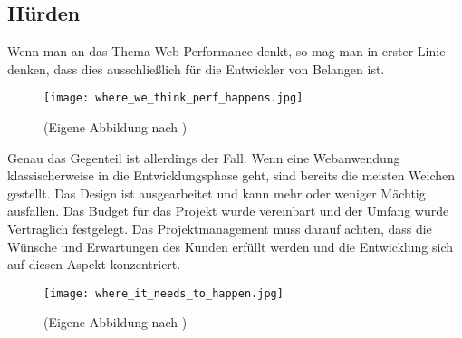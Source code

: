 	\subsection{Hürden} %
	\label{sub:hürden}
	
	Wenn man an das Thema Web Performance denkt, so mag man in erster Linie denken, dass dies ausschließlich für die Entwickler von Belangen ist.
	
	\begin{figure}[htbp]
		\begin{center}
			\texttt{[image: where\_we\_think\_perf\_happens.jpg]}
			\caption{(Eigene Abbildung nach \autocite[p. 10]{kovalcin15})}
			\label{fig:where_we_think_perf_happens}
		\end{center}
	\end{figure}

	Genau das Gegenteil ist allerdings der Fall. Wenn eine Webanwendung klassischerweise in die Entwicklungsphase geht, sind bereits die meisten Weichen gestellt. Das Design ist ausgearbeitet und kann mehr oder weniger Mächtig ausfallen. Das Budget für das Projekt wurde vereinbart und der Umfang wurde Vertraglich festgelegt. Das Projektmanagement muss darauf achten, dass die Wünsche und Erwartungen des Kunden erfüllt werden und die Entwicklung sich auf diesen Aspekt konzentriert.

	\begin{figure}[htbp]
		\begin{center}
			\texttt{[image: where\_it\_needs\_to\_happen.jpg]}
			\caption{(Eigene Abbildung nach \autocite[p. 11]{kovalcin15})}
			\label{fig:where_it_needs_to_happen}
		\end{center}
	\end{figure}


